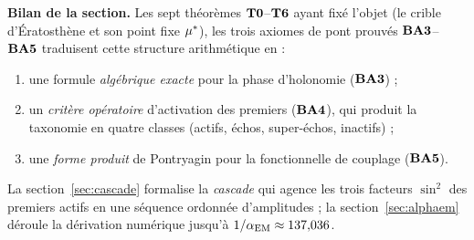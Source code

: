 \bigskip\noindent\textbf{Bilan de la section.} Les sept théorèmes $\textbf{T0}$--$\textbf{T6}$ ayant fixé l'objet (le crible d'Ératosthène et son point fixe $\mu^{*}$), les trois axiomes de pont prouvés $\textbf{BA3}$--$\textbf{BA5}$ traduisent cette structure arithmétique en :
\begin{enumerate}[nosep,label=(\textit{\roman*})]
\item une formule \emph{algébrique exacte} pour la phase d'holonomie ($\textbf{BA3}$) ;
\item un \emph{critère opératoire} d'activation des premiers ($\textbf{BA4}$), qui produit la taxonomie en quatre classes (actifs, échos, super-échos, inactifs) ;
\item une \emph{forme produit} de Pontryagin pour la fonctionnelle de couplage ($\textbf{BA5}$).
\end{enumerate}
La section~\ref{sec:cascade} formalise la \emph{cascade} qui agence les trois facteurs $\sin^2$ des premiers actifs en une séquence ordonnée d'amplitudes ; la section~\ref{sec:alphaem} déroule la dérivation numérique jusqu'à $1/\alpha_{\rm EM} \approx 137{,}036$.
